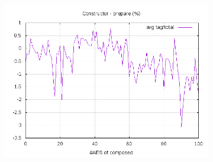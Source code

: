 \documentclass[10pt,a4paper]{article}
\begin{document}
\begin{figure}[h]
\begin{subfigure}[t]{0.3\textwidth}
        \includegraphics[width=\textwidth]{const_prepare_frac}
        \caption{}
    \end{subfigure}


\end{figure}
\end{document}
